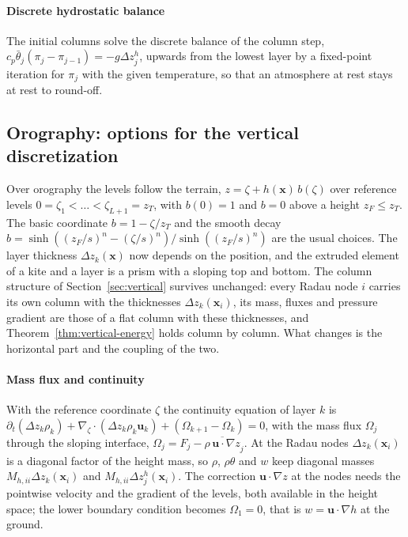 \documentclass[preprint,12pt]{elsarticle}
\newcommand{\bu}{\mathbf{u}}
\theoremstyle{definition}
\begin{document}
\paragraph{Discrete hydrostatic balance} The initial columns solve the discrete balance of the column step,
$c_p\bar\theta_j(\pi_j - \pi_{j-1}) = -g\Delta z^h_j$, upwards from the lowest layer by a fixed-point
iteration for $\pi_j$ with the given temperature, so that an atmosphere at rest stays at rest to
round-off.

\subsection{Orography: options for the vertical discretization}\label{sec:orography}
Over orography the levels follow the terrain, $z = \zeta + h(\mathbf{x})\,b(\zeta)$ over reference levels
$0 = \zeta_1 < \dots < \zeta_{L+1} = z_T$, with $b(0) = 1$ and $b = 0$ above a height $z_F \le z_T$. The basic
coordinate $b = 1 - \zeta/z_T$ \cite{GalChen1975} and the smooth decay
$b = \sinh((z_F/s)^n - (\zeta/s)^n)/\sinh((z_F/s)^n)$ \cite{Schaer2002} are the usual choices. The layer
thickness $\Delta z_k(\mathbf{x})$ now depends on the position, and the extruded element of a kite and a layer is a
prism with a sloping top and bottom. The column structure of Section~\ref{sec:vertical} survives unchanged:
every Radau node $i$ carries its own column with the thicknesses $\Delta z_k(\mathbf{x}_i)$, its mass, fluxes and
pressure gradient are those of a flat column with these thicknesses, and Theorem~\ref{thm:vertical-energy}
holds column by column. What changes is the horizontal part and the coupling of the two.

\paragraph{Mass flux and continuity} With the reference coordinate $\zeta$ the continuity equation of layer $k$
is $\partial_t(\Delta z_k\rho_k) + \nabla_\zeta\cdot(\Delta z_k\rho_k\bu_k) + (\Omega_{k+1} - \Omega_k) = 0$,
with the mass flux $\Omega_j$ through the sloping interface, $\Omega_j = F_j - \overline{\rho\,\bu\cdot\nabla z}_j$.
At the Radau nodes $\Delta z_k(\mathbf{x}_i)$ is a diagonal factor of the height mass, so $\rho$, $\rho\theta$ and $w$
keep diagonal masses $M_{h,ii}\Delta z_k(\mathbf{x}_i)$ and $M_{h,ii}\Delta z^h_j(\mathbf{x}_i)$. The correction
$\bu\cdot\nabla z$ at the nodes needs the pointwise velocity and the gradient of the levels, both available in
the height space; the lower boundary condition becomes $\Omega_1 = 0$, that is $w = \bu\cdot\nabla h$ at the
ground.
\end{document}
